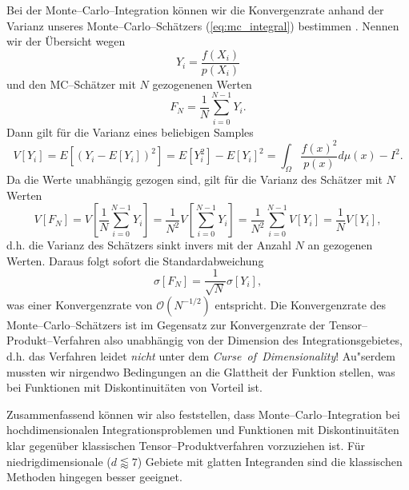 	Bei der Monte--Carlo--Integration können wir die Konvergenzrate anhand der Varianz unseres Monte--Carlo--Schätzers (\ref{eq:mc_integral}) bestimmen \citep[][2.4.1]{Veach:1997p9136}. Nennen wir der Übersicht wegen
	$$Y_i=\frac{f(X_i)}{p(X_i)}$$
	und den MC--Schätzer mit $N$ gezogenenen Werten
	$$F_N=\frac{1}{N}\sum_{i=0}^{N-1} Y_i.$$
	Dann gilt für die Varianz eines beliebigen Samples
	\begin{equation}
		V[Y_i]=E[(Y_i-E[Y_i])^2]=E[Y_i^2]-E[Y_i]^2=\int_\Omega \frac{f(x)^2}{p(x)}d\mu(x)-I^2.
		\label{eq:mc_variance}
	\end{equation}
	Da die Werte unabhängig gezogen sind, gilt für die Varianz des Schätzer mit $N$ Werten
	$$V[F_N]=V\left[\frac{1}{N}\sum_{i=0}^{N-1}Y_i\right]=\frac{1}{N^2}V\left[\sum_{i=0}^{N-1}Y_i\right]=\frac{1}{N^2}\sum_{i=0}^{N-1}V[Y_i]=\frac{1}{N}V[Y_i],$$
	d.h. die Varianz des Schätzers sinkt invers mit der Anzahl $N$ an gezogenen Werten. Daraus folgt sofort die Standardabweichung
	\begin{equation}
		\sigma[F_N]=\frac{1}{\sqrt{N}}\sigma[Y_i],
		\label{eq:mc_standarddeviation}
	\end{equation}
	was einer Konvergenzrate von $\mathcal{O}(N^{-1/2})$ entspricht. Die Konvergenzrate des Monte--Carlo--Schätzers ist im Gegensatz zur Konvergenzrate der Tensor--Produkt--Verfahren also unabhängig von der Dimension des Integrationsgebietes, d.h. das Verfahren leidet {\em nicht} unter dem {\em Curse~of~Dimensionality}! Au"serdem mussten wir nirgendwo Bedingungen an die Glattheit der Funktion stellen, was bei Funktionen mit Diskontinuitäten von Vorteil ist.
	
	Zusammenfassend können wir also feststellen, dass Monte--Carlo--Integration bei hochdimensionalen Integrationsproblemen und Funktionen mit Diskontinuitäten klar gegenüber klassischen Tensor--Produktverfahren vorzuziehen ist. Für niedrigdimensionale ($d\lessapprox 7$) Gebiete mit glatten Integranden sind die klassischen Methoden hingegen besser geeignet.
	
	
